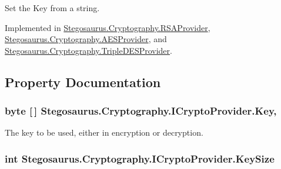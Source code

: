 Set the Key from a string. 



Implemented in \hyperlink{class_stegosaurus_1_1_cryptography_1_1_r_s_a_provider_a18053ea1b1d9709c8631e97bef06c6a8}{Stegosaurus.\+Cryptography.\+R\+S\+A\+Provider}, \hyperlink{class_stegosaurus_1_1_cryptography_1_1_a_e_s_provider_ab9119737779ce4aea6c8c7e6c4725923}{Stegosaurus.\+Cryptography.\+A\+E\+S\+Provider}, and \hyperlink{class_stegosaurus_1_1_cryptography_1_1_triple_d_e_s_provider_ab7413df54e7753ae7ce4776f94521c7a}{Stegosaurus.\+Cryptography.\+Triple\+D\+E\+S\+Provider}.



\subsection{Property Documentation}
\subsubsection[{\texorpdfstring{Key}{Key}}]{\setlength{\rightskip}{0pt plus 5cm}byte \mbox{[}$\,$\mbox{]} Stegosaurus.\+Cryptography.\+I\+Crypto\+Provider.\+Key\hspace{0.3cm}{\ttfamily [get]}, {\ttfamily [set]}}\hypertarget{interface_stegosaurus_1_1_cryptography_1_1_i_crypto_provider_a0a8633906966fa70858e0762db3633af}{}\label{interface_stegosaurus_1_1_cryptography_1_1_i_crypto_provider_a0a8633906966fa70858e0762db3633af}


The key to be used, either in encryption or decryption. 

\subsubsection[{\texorpdfstring{Key\+Size}{KeySize}}]{\setlength{\rightskip}{0pt plus 5cm}int Stegosaurus.\+Cryptography.\+I\+Crypto\+Provider.\+Key\+Size\hspace{0.3cm}{\ttfamily [get]}}\hypertarget{interface_stegosaurus_1_1_cryptography_1_1_i_crypto_provider_a0322f20ed8b9f630de3945fcd32e282e}{}\label{interface_stegosaurus_1_1_cryptography_1_1_i_crypto_provider_a0322f20ed8b9f630de3945fcd32e282e}


